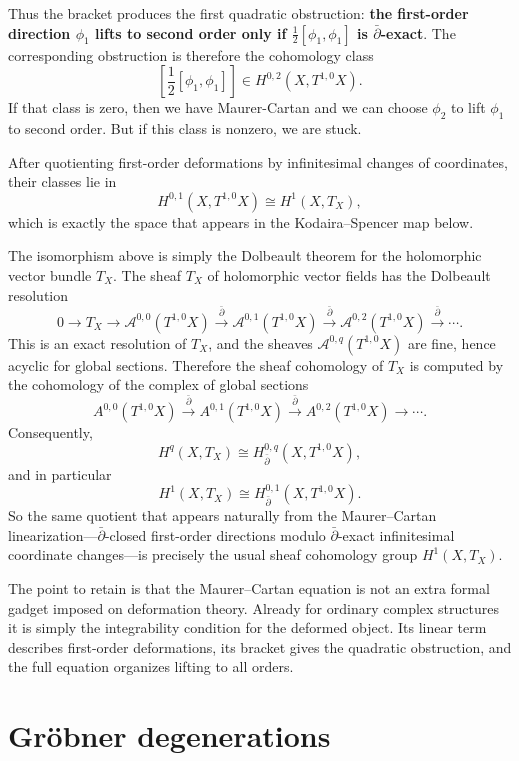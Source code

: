Thus the bracket produces the first quadratic
obstruction: {\bf the first-order direction $\phi_1$ lifts
to second order only if
$\frac12[\phi_1,\phi_1]$ is
$\bar\partial$-exact}.
The corresponding obstruction is therefore
the cohomology class
$$
\left[\frac{1}{2}[\phi_1,\phi_1]\right]
\in
H^{0,2}(X,T^{1,0}X).
$$
If that class is zero, then we have
Maurer-Cartan and we can choose $\phi_2$
to lift $\phi_1$ to second order.
But if this class is nonzero, we are stuck.


After quotienting first-order deformations by
infinitesimal changes of coordinates, their classes lie
in
$$
H^{0,1}(X,T^{1,0}X)\cong H^1(X,T_X),
$$
which is exactly the space that appears in the
Kodaira--Spencer map below.

The isomorphism above is simply the Dolbeault theorem for
the holomorphic vector bundle $T_X$. The sheaf $T_X$ of
holomorphic vector fields has the Dolbeault resolution
$$
0\longrightarrow T_X
\longrightarrow \mathcal A^{0,0}(T^{1,0}X)
\xrightarrow{\bar\partial}
\mathcal A^{0,1}(T^{1,0}X)
\xrightarrow{\bar\partial}
\mathcal A^{0,2}(T^{1,0}X)
\xrightarrow{\bar\partial}\cdots .
$$
This is an exact resolution of $T_X$, and the sheaves
$\mathcal A^{0,q}(T^{1,0}X)$ are fine, hence acyclic for
global sections. Therefore the sheaf cohomology of $T_X$
is computed by the cohomology of the complex of global
sections
$$
A^{0,0}(T^{1,0}X)
\xrightarrow{\bar\partial}
A^{0,1}(T^{1,0}X)
\xrightarrow{\bar\partial}
A^{0,2}(T^{1,0}X)
\longrightarrow\cdots .
$$
Consequently,
$$
H^q(X,T_X)\cong H^{0,q}_{\bar\partial}
(X,T^{1,0}X),
$$
and in particular
$$
H^1(X,T_X)\cong H^{0,1}_{\bar\partial}
(X,T^{1,0}X).
$$
So the same quotient that appears naturally from the
Maurer--Cartan linearization---$\bar\partial$-closed
first-order directions modulo $\bar\partial$-exact
infinitesimal coordinate changes---is precisely the usual
sheaf cohomology group $H^1(X,T_X)$.

\medskip\noindent
The point to retain is that the Maurer--Cartan equation
is not an extra formal gadget imposed on deformation
theory. Already for ordinary complex structures it is
simply the integrability condition for the deformed
object. Its linear term describes first-order
deformations, its bracket gives the quadratic
obstruction, and the full equation organizes lifting to
all orders.

\section{Gröbner degenerations}
\label{section-grobner-degenerations}

